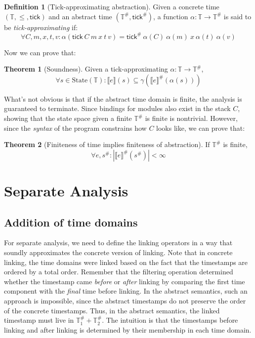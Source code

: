 \documentclass[acmsmall,review]{acmart}\settopmatter{printfolios=true,printccs=false,printacmref=false}
\theoremstyle{definition}
\newtheorem{definition}{Definition}[section]
\newtheorem{thm}{Theorem}[section]
\newcommand*{\A}[1]{{#1}^{\#}}
\newcommand*{\Time}{\mathbb{T}}
\newcommand*{\ATime}{\A{\Time}}
\newcommand*{\mem}{m}
\newcommand*{\State}[1]{\text{State}({#1})}
\newcommand*{\sembracket}[1]{\lBrack{#1}\rBrack}
\newcommand*{\tick}{\mathsf{tick}}
\begin{document}
\begin{definition}[Tick-approximating abstraction]
  Given a concrete time $(\Time,\le,\tick)$ and an abstract time $(\ATime, \A\tick)$, a function $\alpha:\Time\rightarrow\ATime$ is said to be \emph{tick-approximating} if:
  \[
    \forall C,\mem,x,t,v:\alpha(\tick\:C\:\mem\:x\:t\:v)=\A\tick\:\alpha(C)\:\alpha(\mem)\:x\:\alpha(t)\:\alpha(v)
  \]
\end{definition}

Now we can prove that:
\begin{thm}[Soundness]
  Given a tick-approximating $\alpha:\Time\rightarrow\ATime$,
  \[
    \forall s\in\State{\Time}:\sembracket{e}(s)\subseteq\gamma(\A{\sembracket{e}}(\alpha(s)))
  \]
\end{thm}

What's not obvious is that if the abstract time domain is finite, the analysis is guaranteed to terminate.
Since bindings for modules also exist in the stack $C$, showing that the state space given a finite $\ATime$ is finite is nontrivial.
However, since the \emph{syntax} of the program constrains how $C$ looks like, we can prove that:

\begin{thm}[Finiteness of time implies finiteness of abstraction]
  If $\ATime$ is finite,
  \[
    \forall e,\A{s}: |\A{\sembracket{e}}(\A{s})|<\infty
  \]
\end{thm}

\section{Separate Analysis}

\subsection{Addition of time domains}
For separate analysis, we need to define the linking operators in a way that soundly approximates the concrete version of linking.
Note that in concrete linking, the time domains were linked based on the fact that the timestamps are ordered by a total order.
Remember that the filtering operation determined whether the timestamp came \emph{before} or \emph{after} linking by comparing the first time component with the \emph{final} time before linking.
In the abstract semantics, such an approach is impossible, since the abstract timestamps do not preserve the order of the concrete timestamps.
Thus, in the abstract semantics, the linked timestamp must live in $\ATime_1+\ATime_2$.
The intuition is that the timestamps before linking and after linking is determined by their membership in each time domain.
\end{document}
